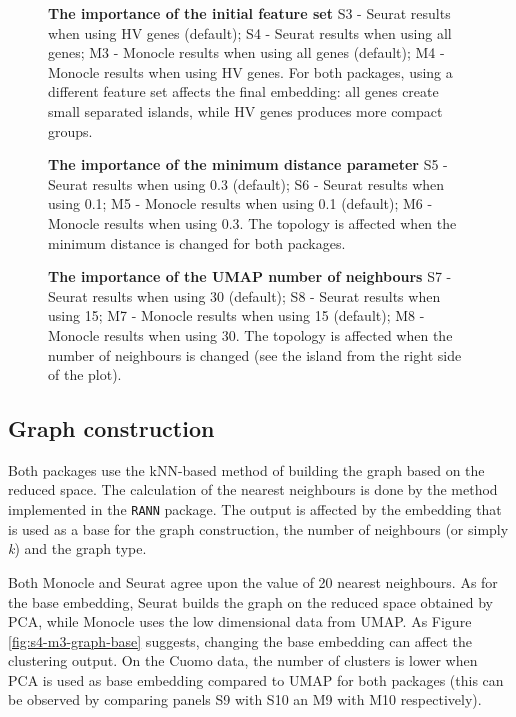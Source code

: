 \begin{landscape}
\begin{figure}[H]
    \centering
    \caption{\label{fig:s4-m3-pca}\textbf{The importance of the initial feature set} S3 - Seurat results when using HV genes (default); S4 - Seurat results when using all genes; M3 - Monocle results when using all genes (default); M4 - Monocle results when using HV genes. For both packages, using a different feature set affects the final embedding: all genes create small separated islands, while HV genes produces more compact groups.}
\end{figure}
\begin{figure}[H]
    \centering
    \caption{\label{fig:s4-m3-min-dist}\textbf{The importance of the minimum distance parameter} S5 - Seurat results when using 0.3 (default); S6 - Seurat results when using 0.1; M5 - Monocle results when using 0.1 (default); M6 - Monocle results when using 0.3. The topology is affected when the minimum distance is changed for both packages.}
\end{figure}
\begin{figure}[H]
    \centering
    \caption{\label{fig:s4-m3-n-neigh-umap}\textbf{The importance of the UMAP number of neighbours} S7 - Seurat results when using 30 (default); S8 - Seurat results when using 15; M7 - Monocle results when using 15 (default); M8 - Monocle results when using 30. The topology is affected when the number of neighbours is changed (see the island from the right side of the plot).}
\end{figure}
\end{landscape}

\subsection{Graph construction}
Both packages use the kNN-based method of building the graph based on the reduced space. The calculation of the nearest neighbours is done by the method implemented in the \verb|RANN| package. The output is affected by the embedding that is used as a base for the graph construction, the number of neighbours (or simply \textit{k}) and the graph type.

Both Monocle and Seurat agree upon the value of 20 nearest neighbours. As for the base embedding, Seurat builds the graph on the reduced space obtained by PCA, while Monocle uses the low dimensional data from UMAP. As Figure \ref{fig:s4-m3-graph-base} suggests, changing the base embedding can affect the clustering output. On the Cuomo data, the number of clusters is lower when PCA is used as base embedding compared to UMAP for both packages (this can be observed by comparing panels S9 with S10 an M9 with M10 respectively).


